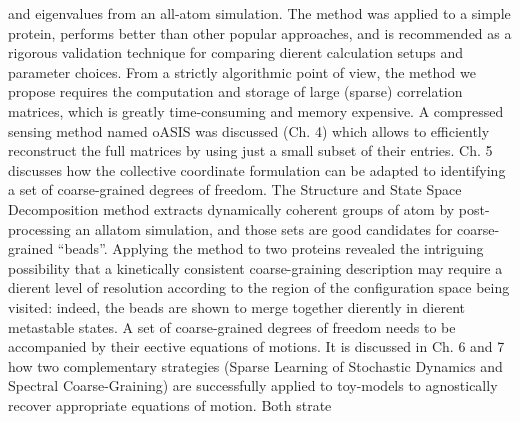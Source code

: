 and eigenvalues from an all-atom simulation. The method was applied to a simple
protein, performs better than other popular approaches, and is recommended as a rigorous
validation technique for comparing dierent calculation setups and parameter choices.
From a strictly algorithmic point of view, the method we propose requires the computation
and storage of large (sparse) correlation matrices, which is greatly time-consuming
and memory expensive. A compressed sensing method named oASIS was discussed (Ch. 4)
which allows to efficiently reconstruct the full matrices by using just a small subset of their
entries.
Ch. 5 discusses how the collective coordinate formulation can be adapted to identifying
a set of coarse-grained degrees of freedom. The Structure and State Space Decomposition
method extracts dynamically coherent groups of atom by post-processing an allatom
simulation, and those sets are good candidates for coarse-grained “beads”. Applying
the method to two proteins revealed the intriguing possibility that a kinetically consistent
coarse-graining description may require a dierent level of resolution according to the region
of the configuration space being visited: indeed, the beads are shown to merge together
dierently in dierent metastable states.
A set of coarse-grained degrees of freedom needs to be accompanied by their eective
equations of motions. It is discussed in Ch. 6 and 7 how two complementary strategies
(Sparse Learning of Stochastic Dynamics and Spectral Coarse-Graining) are successfully
applied to toy-models to agnostically recover appropriate equations of motion. Both strate


